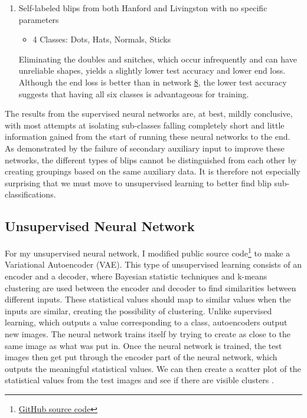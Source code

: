 \documentclass[a4paper]{article}
\begin{document}
\begin{enumerate}
	\item Self-labeled blips from both Hanford and Livingston with no specific parameters
	\begin{itemize}
		\item 4 Classes: Dots, Hats, Normals, Sticks
	\end{itemize} Eliminating the doubles and snitches, which occur infrequently and can have unreliable shapes, yields a slightly lower test accuracy and lower end loss. Although the end loss is better than in network \hyperlink{multi}{8}, the lower test accuracy suggests that having all six classes is advantageous for training.
	
\end{enumerate}

The results from the supervised neural networks are, at best, mildly conclusive, with most attempts at isolating sub-classes falling completely short and little information gained from the start of running these neural networks to the end. As demonstrated by the failure of secondary auxiliary input to improve these networks, the different types of blips cannot be distinguished from each other by creating groupings based on the same auxiliary data. It is therefore not especially surprising that we must move to unsupervised learning to better find blip sub-classifications.

\subsection{Unsupervised Neural Network} \label{section:unsup}

For my unsupervised neural network, I modified public source code\footnote{\href{https://github.com/keras-team/keras/blob/master/examples/variational_autoencoder.py}{GitHub source code}} to make a Variational Autoencoder (VAE). This type of unsupervised learning consists of an encoder and a decoder, where Bayesian statistic techniques and k-means clustering are used between the encoder and decoder to find similarities between different inputs. These statistical values should map to similar values when the inputs are similar, creating the possibility of clustering. Unlike supervised learning, which outputs a value corresponding to a class, autoencoders output new images. The neural network trains itself by trying to create as close to the same image as what was put in. Once the neural network is trained, the test images then get put through the encoder part of the neural network, which outputs the meaningful statistical values. We can then create a scatter plot of the statistical values from the test images and see if there are visible clusters \cite{Kingma:2013}. 
\end{document}
